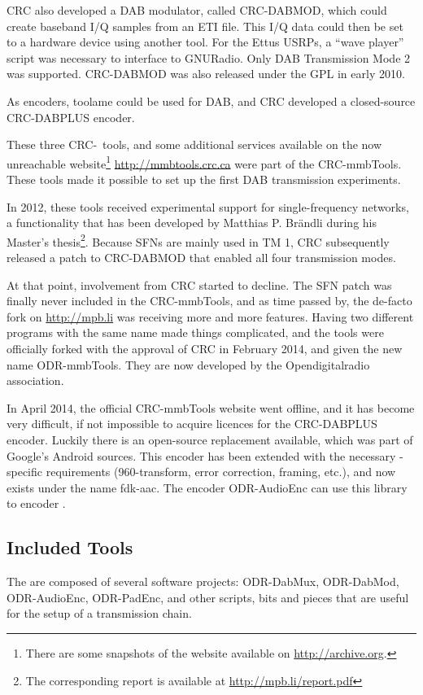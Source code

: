 CRC also developed a DAB modulator, called \mbox{CRC-DABMOD}, which could create
baseband I/Q samples from an ETI file. This I/Q data could then be set to
a hardware device using another tool. For the Ettus USRPs, a ``wave player''
script was necessary to interface to GNURadio. Only DAB Transmission Mode 2 was
supported. \mbox{CRC-DABMOD} was also released under the GPL in early 2010.

As encoders, toolame could be used for DAB, and CRC developed a closed-source
\mbox{CRC-DABPLUS} \dabplus encoder.

These three CRC-~tools, and some additional services available on the now
unreachable website\footnote{There are some snapshots of the website available
    on \url{http://archive.org}.} \url{http://mmbtools.crc.ca} were
part of the \mbox{CRC-mmbTools}. These tools made it possible to set up the
first DAB transmission experiments.

In 2012, these tools received experimental support for single-frequency
networks, a functionality that has been developed by Matthias P. Brändli during
his Master's thesis\footnote{The corresponding report is available at
    \url{http://mpb.li/report.pdf}}.
Because SFNs are mainly used in TM 1, CRC subsequently released a patch to
\mbox{CRC-DABMOD} that enabled all four transmission modes.

At that point, involvement from CRC started to decline. The SFN patch was
finally never included in the \mbox{CRC-mmbTools}, and as time passed by, the
de-facto fork on \url{http://mpb.li} was receiving more and more features.
Having two different programs with the same name made things complicated, and
the tools were officially forked with the approval of CRC in February 2014, and
given the new name \mbox{ODR-mmbTools}. They are now developed by the
Opendigitalradio association.

In April 2014, the official \mbox{CRC-mmbTools} website went offline, and it has
become very difficult, if not impossible to acquire licences for the
\mbox{CRC-DABPLUS} encoder. Luckily there is an open-source replacement
available, which was part of Google's Android sources. This encoder has been
extended with the necessary \dabplus{}-specific requirements (960-transform,
error correction, framing, etc.), and now exists under the name
\mbox{fdk-aac}. The encoder \mbox{ODR-AudioEnc} can use this library to encoder
\dabplus{}.

\subsection{Included Tools}
The \mmbtools are composed of several software projects:
\mbox{ODR-DabMux}, \mbox{ODR-DabMod},
\mbox{ODR-AudioEnc}, \mbox{ODR-PadEnc}, and other scripts, bits and pieces
that are useful for the setup of a transmission chain.

